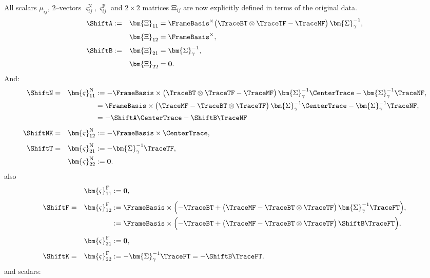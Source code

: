 All scalars $\mu_{ij}$, $2$–vectors $\bm{\varsigma}_{ij}^{\mathrm{N}},\bm{\varsigma}_{ij}^{\mathrm{F}}$ and
$2\times2$ matrices $\bm{\Xi}_{ij}$ are now explicitly defined in terms of the original data. 
\[
\begin{aligned}
\ShiftA := &&\bm{\Xi}_{11}
&=
\FrameBasis^\times\bigl(\TraceBT\otimes\TraceTF - \TraceMF\bigr)\,\bm{\Sigma}_{\gamma}^{-1},
\\[2pt]
&&\bm{\Xi}_{12}
&= \FrameBasis^\times,
\\[2pt]
\ShiftB := &&\bm{\Xi}_{21}
&=\bm{\Sigma}_{\gamma}^{-1},
\\[2pt]
&&\bm{\Xi}_{22} &= \mathbf{0}.
\end{aligned}
\]
And:
\[
\begin{aligned}
\ShiftN = 
&&\bm{\varsigma}_{11}^{\mathrm{N}}
&:=
-\FrameBasis \times
\bigl(\TraceBT\otimes\TraceTF - \TraceMF\bigr)\,\bm{\Sigma}_{\gamma}^{-1}\CenterTrace-\bm{\Sigma}_{\gamma}^{-1}\TraceNF, \\
&&&=\FrameBasis \times
\bigl(\TraceMF-\TraceBT\otimes\TraceTF \bigr)\,\bm{\Sigma}_{\gamma}^{-1}\CenterTrace-\bm{\Sigma}_{\gamma}^{-1}\TraceNF, \\
&&&=-\ShiftA\CenterTrace - \ShiftB\TraceNF 
\\[4pt]
\ShiftNK=&&\bm{\varsigma}_{12}^{\mathrm{N}}
&:=
-\FrameBasis\times\CenterTrace,
\\[4pt]
%
\ShiftT=
&&\bm{\varsigma}_{21}^{\mathrm{N}}
&:=
-\bm{\Sigma}_{\gamma}^{-1}\TraceTF,
\\
%
&&\bm{\varsigma}_{22}^{\mathrm{N}}
&:= \mathbf{0}.
\end{aligned}
\]
also
\[
\begin{aligned}
&&\bm{\varsigma}_{11}^{\mathrm{F}}
&:= \mathbf{0},
\\[4pt]
\ShiftF = 
&&\bm{\varsigma}_{12}^{\mathrm{F}}
&:=
\FrameBasis\times\Bigl(
-\TraceBT
+
\bigl(\TraceMF - \TraceBT\otimes\TraceTF\bigr)\,\bm{\Sigma}_{\gamma}^{-1}\TraceFT
\Bigr),\\
&&&:=
\FrameBasis\times\Bigl(
-\TraceBT+\bigl(\TraceMF - \TraceBT\otimes\TraceTF\bigr)\,\ShiftB\TraceFT
\Bigr),
\\[4pt]
&&\bm{\varsigma}_{21}^{\mathrm{F}}
&:= \mathbf{0},
\\[4pt]
\ShiftK=&&\bm{\varsigma}_{22}^{\mathrm{F}}
&:=
-\bm{\Sigma}_{\gamma}^{-1}\TraceFT = -\ShiftB\TraceFT.
\end{aligned}
\]
and scalars:
